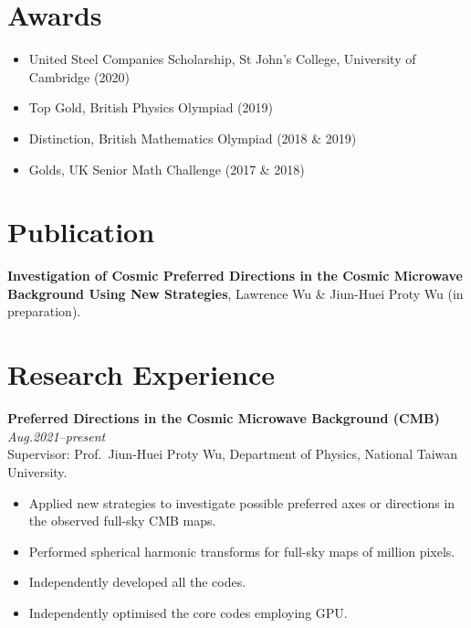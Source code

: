 \documentclass[11pt,a4paper,roman]{moderncv}        %
\begin{document}
\section{Awards}
\begin{itemize}
	\item United Steel Companies Scholarship, St John's College, University of Cambridge (2020)
	\item Top Gold, British Physics Olympiad (2019)
	\item Distinction, British Mathematics Olympiad (2018 \& 2019)
\item{Golds, UK Senior Math Challenge (2017 \& 2018)}
\end{itemize}


\section{Publication}
\textbf{Investigation of Cosmic Preferred Directions in the Cosmic Microwave Background Using New Strategies}, Lawrence Wu \& Jiun-Huei Proty Wu (in preparation).

\section{Research Experience}

\textbf{Preferred Directions in the Cosmic Microwave Background (CMB)} \hfill \textit{Aug.2021--present}
\vspace*{1mm}\\
{Supervisor: Prof.\ Jiun-Huei Proty Wu, Department of Physics, National Taiwan University.}
\vspace*{1mm}
\begin{itemize}
	\item Applied new strategies to investigate possible preferred axes or directions in the observed full-sky CMB maps.
	\item Performed spherical harmonic transforms for full-sky maps of million pixels.
	\item Independently developed all the codes.
	\item Independently optimised the core codes employing GPU.\\
\end{itemize}
\end{document}
